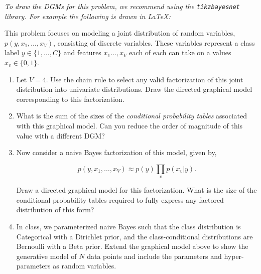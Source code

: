 
\begin{problem}
\textit{To draw the DGMs for this problem, we recommend using the \texttt{tikzbayesnet} library. For example the following is drawn in \LaTeX:}
\begin{center}


\end{center}


\noindent  This problem focuses on modeling a joint distribution of random variables,
$p(y, x_1, \ldots, x_V)$, consisting of discrete variables. These variables represent a class label $y
\in \{1, \ldots, C\}$ and features $x_1 \ldots, x_V$
each of each can take on a values $x_{v} \in \{0, 1\}$.


\begin{enumerate}[label=(\alph*)]
\item  Let $V = 4$. Use the chain rule to select any valid factorization of this joint distribution into univariate distributions. Draw the directed graphical model corresponding to this factorization.

\item What is the sum of the sizes of the \textit{conditional probability tables} associated with
this graphical model. Can you reduce the order of magnitude of this value with a different DGM?

\item  Now consider a naive Bayes factorization of this model, given by,

\[ p(y, x_1, \ldots, x_V ) \approx p(y) \prod_{v} p(x_v | y). \]

Draw a directed graphical model for this factorization.
What is the size of the conditional probability tables required to
fully express any factored distribution of this form?

\item In class, we parameterized naive Bayes such that the class
  distribution is Categorical with a Dirichlet prior, and the
  class-conditional distributions are Bernoulli with a Beta
  prior. Extend the graphical model above to show the generative model
  of $N$ data points and include the parameters and hyper-parameters
  as random variables.



\end{enumerate}
\end{problem}
